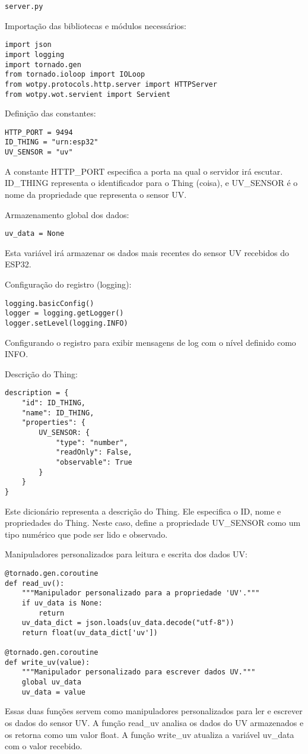 \texttt{server.py}

Importação das bibliotecas e módulos necessários:
\begin{verbatim}
import json
import logging
import tornado.gen
from tornado.ioloop import IOLoop
from wotpy.protocols.http.server import HTTPServer
from wotpy.wot.servient import Servient
\end{verbatim}

Definição das constantes:
\begin{verbatim}
HTTP_PORT = 9494
ID_THING = "urn:esp32"
UV_SENSOR = "uv"
\end{verbatim}
A constante HTTP\_PORT especifica a porta na qual o servidor irá escutar. ID\_THING representa o identificador para o Thing (coisa), e UV\_SENSOR é o nome da propriedade que representa o sensor UV.

Armazenamento global dos dados:
\begin{verbatim}
uv_data = None
\end{verbatim}
Esta variável irá armazenar os dados mais recentes do sensor UV recebidos do ESP32.

Configuração do registro (logging):
\begin{verbatim}
logging.basicConfig()
logger = logging.getLogger()
logger.setLevel(logging.INFO)
\end{verbatim}
Configurando o registro para exibir mensagens de log com o nível definido como INFO.

Descrição do Thing:
\begin{verbatim}
description = {
    "id": ID_THING,
    "name": ID_THING,
    "properties": {
        UV_SENSOR: {
            "type": "number",
            "readOnly": False,
            "observable": True
        }
    }
}
\end{verbatim}
Este dicionário representa a descrição do Thing. Ele especifica o ID, nome e propriedades do Thing. Neste caso, define a propriedade UV\_SENSOR como um tipo numérico que pode ser lido e observado.

Manipuladores personalizados para leitura e escrita dos dados UV:
\begin{verbatim}
@tornado.gen.coroutine
def read_uv():
    """Manipulador personalizado para a propriedade 'UV'."""
    if uv_data is None:
        return
    uv_data_dict = json.loads(uv_data.decode("utf-8"))
    return float(uv_data_dict['uv'])

@tornado.gen.coroutine
def write_uv(value):
    """Manipulador personalizado para escrever dados UV."""
    global uv_data
    uv_data = value
\end{verbatim}
Essas duas funções servem como manipuladores personalizados para ler e escrever os dados do sensor UV. A função read\_uv analisa os dados do UV armazenados e os retorna como um valor float. A função write\_uv atualiza a variável uv\_data com o valor recebido.


